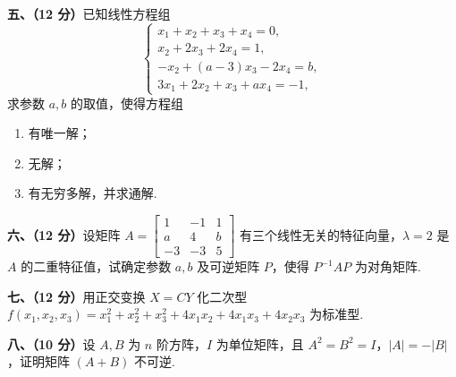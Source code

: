 \documentclass[a4paper,11pt]{ctexart}
\begin{document}
\textbf{五、（12 分）}已知线性方程组
\[
  \begin{cases}
    x_1 + x_2 + x_3 + x_4 = 0, \\
    x_2 + 2x_3 + 2x_4 = 1, \\
    -x_2 + (a - 3)x_3 - 2x_4 = b, \\
    3x_1 + 2x_2 + x_3 + a x_4 = -1,
  \end{cases}
\]
求参数 $a, b$ 的取值，使得方程组
\begin{enumerate}[label=\arabic*., leftmargin=2.4em, itemsep=0.25em, topsep=0.3em]
  \item 有唯一解；
  \item 无解；
  \item 有无穷多解，并求通解.
\end{enumerate}

\vspace{0.6em}

\textbf{六、（12 分）}设矩阵 $A = \begin{bmatrix} 1 & -1 & 1 \\ a & 4 & b \\ -3 & -3 & 5 \end{bmatrix}$ 有三个线性无关的特征向量，$\lambda = 2$ 是 $A$ 的二重特征值，试确定参数 $a, b$ 及可逆矩阵 $P$，使得 $P^{-1}AP$ 为对角矩阵.

\vspace{0.6em}

\textbf{七、（12 分）}用正交变换 $X = CY$ 化二次型 $f(x_1, x_2, x_3) = x_1^2 + x_2^2 + x_3^2 + 4x_1 x_2 + 4x_1 x_3 + 4x_2 x_3$ 为标准型.

\vspace{0.6em}

\textbf{八、（10 分）}设 $A, B$ 为 $n$ 阶方阵，$I$ 为单位矩阵，且 $A^2 = B^2 = I$，$|A| = -|B|$，证明矩阵 $(A + B)$ 不可逆.
\end{document}
